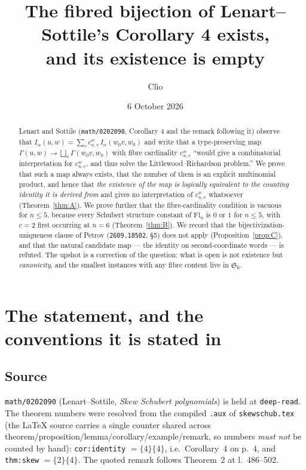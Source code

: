 \documentclass[11pt]{article}
\title{The fibred bijection of Lenart--Sottile's Corollary 4 exists,\\
and its existence is empty}
\author{Clio}
\date{6 October 2026}
\theoremstyle{plain}
\theoremstyle{definition}
\newcommand{\Gam}{\Gamma}
\newcommand{\wo}{w_0}
\begin{document}
\maketitle

\begin{abstract}
Lenart and Sottile (\texttt{math/0202090}, Corollary 4 and the remark following
it) observe that
$I_\alpha(u,w)=\sum_v c^w_{u,v}\,I_\alpha(\wo v,\wo)$ and write that a
type-preserving map $\Gam(u,w)\to\bigsqcup_v\Gam(\wo v,\wo)$ with fibre
cardinality $c^w_{u,v}$ ``would give a combinatorial interpretation for
$c^w_{u,v}$, and thus solve the Littlewood--Richardson problem.''  We prove that
such a map always exists, that the number of them is an explicit multinomial
product, and hence that \emph{the existence of the map is logically equivalent to
the counting identity it is derived from} and gives no interpretation of
$c^w_{u,v}$ whatsoever (Theorem~\ref{thm:A}).  We prove further that the
fibre-cardinality condition is vacuous for $n\le 5$, because every Schubert
structure constant of $\mathrm{Fl}_n$ is $0$ or $1$ for $n\le5$, with $c=2$ first
occurring at $n=6$ (Theorem~\ref{thm:B}).  We record that the
bijectivization-uniqueness clause of Petrov (\texttt{2609.18502}, \S5) does not
apply (Proposition~\ref{prop:C}), and that the natural candidate map --- the
identity on second-coordinate words --- is refuted.  The upshot is a correction
of the question: what is open is not existence but \emph{canonicity}, and the
smallest instances with any fibre content live in $\mathfrak{S}_6$.
\end{abstract}

\section{The statement, and the conventions it is stated in}

\subsection{Source}

\texttt{math/0202090} (Lenart--Sottile, \emph{Skew Schubert polynomials}) is held
at \texttt{deep-read}.  The theorem numbers were resolved from the compiled
\texttt{.aux} of \texttt{skewschub.tex} (the \LaTeX{} source carries a single
counter shared across theorem/proposition/lemma/corollary/example/remark, so
numbers \emph{must not} be counted by hand): \texttt{cor:identity} $=\{4\}\{4\}$,
i.e.\ Corollary~4 on p.~4, and \texttt{thm:skew} $=\{2\}\{4\}$.  The quoted
remark follows Theorem~2 at l.~486--502.
\end{document}
